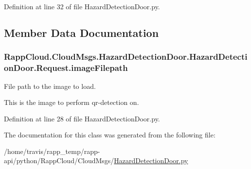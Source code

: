 Definition at line 32 of file Hazard\-Detection\-Door.\-py.



\subsection{Member Data Documentation}
\hypertarget{classRappCloud_1_1CloudMsgs_1_1HazardDetectionDoor_1_1HazardDetectionDoor_1_1Request_a9c1c9389a70d7f2996dae83477414ec1}{
\subsubsection[{image\-Filepath}]{\setlength{\rightskip}{0pt plus 5cm}Rapp\-Cloud.\-Cloud\-Msgs.\-Hazard\-Detection\-Door.\-Hazard\-Detection\-Door.\-Request.\-image\-Filepath}}\label{classRappCloud_1_1CloudMsgs_1_1HazardDetectionDoor_1_1HazardDetectionDoor_1_1Request_a9c1c9389a70d7f2996dae83477414ec1}


File path to the image to load. 

This is the image to perform qr-\/detection on. 

Definition at line 28 of file Hazard\-Detection\-Door.\-py.



The documentation for this class was generated from the following file\-:\begin{DoxyCompactItemize}
\item 
/home/travis/rapp\-\_\-temp/rapp-\/api/python/\-Rapp\-Cloud/\-Cloud\-Msgs/\hyperlink{HazardDetectionDoor_8py}{Hazard\-Detection\-Door.\-py}\end{DoxyCompactItemize}
